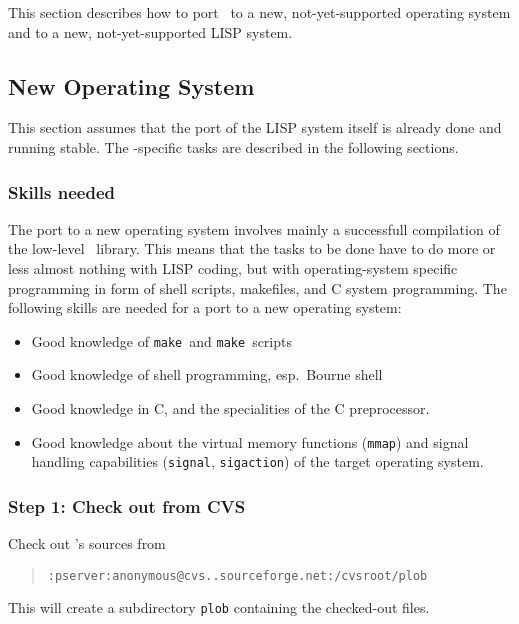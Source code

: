 This section describes how to port \plob\ to a new, not-yet-supported
operating system and to a new, not-yet-supported LISP system.


\subsection{New Operating System}

This section assumes that the port of the LISP system itself is
already done and running stable. The \plob-specific tasks are
described in the following sections.

\subsubsection{Skills needed}

The port to a new operating system involves mainly a successfull
compilation of the low-level \postore\ library. This means that the
tasks to be done have to do more or less almost nothing with LISP
coding, but with operating-system specific programming in form of
shell scripts, makefiles, and C system programming.  The following
skills are needed for a port to a new operating system:

\begin{itemize}

\item Good knowledge of \texttt{make}\ and \texttt{make}\ scripts

\item Good knowledge of shell programming, esp.\ Bourne shell

\item Good knowledge in C, and the specialities of the C preprocessor.

\item Good knowledge about the virtual memory functions
  (\texttt{mmap}) and signal handling capabilities (\texttt{signal},
  \texttt{sigaction}) of the target operating system.

\end{itemize}

\subsubsection{Step 1: Check out from CVS}

Check out \plob's sources from
\begin{quotation}
\texttt{:pserver:anonymous@cvs..sourceforge.net:/cvsroot/plob}
\end{quotation}
This will create a subdirectory \texttt{plob} containing the
checked-out files.

